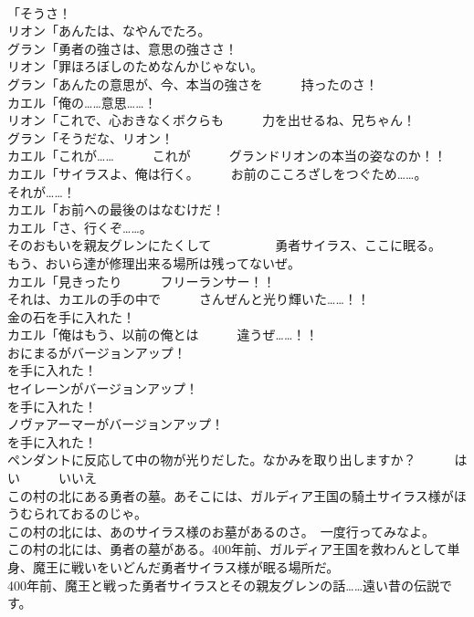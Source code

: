 \documentclass[8pt]{extreport}
\begin{document}
\begin{CJK}{UTF8}{min}
\\	「そうさ！	
\\	リオン「あんたは、なやんでたろ。	
\\	グラン「勇者の強さは、意思の強ささ！	
\\	リオン「罪ほろぼしのためなんかじゃない。	
\\	グラン「あんたの意思が、今、本当の強さを　　　持ったのさ！	
\\	カエル「俺の……意思……！	
\\	リオン「これで、心おきなくボクらも　　　力を出せるね、兄ちゃん！	
\\	グラン「そうだな、リオン！	
\\	カエル「これが……　　　これが　　　グランドリオンの本当の姿なのか！！	
\\	カエル「サイラスよ、俺は行く。　　　お前のこころざしをつぐため……。　　　それが……！	
\\	カエル「お前への最後のはなむけだ！	
\\	カエル「さ、行くぞ……。	
\\	そのおもいを親友グレンにたくして　　　　　勇者サイラス、ここに眠る。	
\\	もう、おいら達が修理出来る場所は残ってないぜ。	
\\	カエル「見きったり　　　フリーランサー！！	
\\	それは、カエルの手の中で　　　さんぜんと光り輝いた……！！	
\\	金の石を手に入れた！	
\\	カエル「俺はもう、以前の俺とは　　　違うぜ……！！	
\\	おにまるがバージョンアップ！　　　　　
\\	を手に入れた！	
\\	セイレーンがバージョンアップ！　　　　
\\	を手に入れた！	
\\	ノヴァアーマーがバージョンアップ！　　　
\\	を手に入れた！	
\\	ペンダントに反応して中の物が光りだした。なかみを取り出しますか？　　　はい　　　いいえ	
\\	この村の北にある勇者の墓。あそこには、ガルディア王国の騎土サイラス様がほうむられておるのじゃ。	
\\	この村の北には、あのサイラス様のお墓があるのさ。　一度行ってみなよ。	
\\	この村の北には、勇者の墓がある。400年前、ガルディア王国を救わんとして単身、魔王に戦いをいどんだ勇者サイラス様が眠る場所だ。	
\\	400年前、魔王と戦った勇者サイラスとその親友グレンの話……遠い昔の伝説です。	

\end{CJK}
\end{document}
